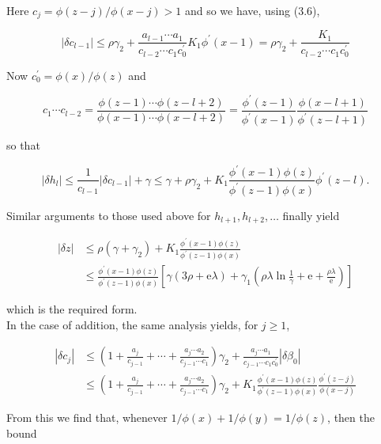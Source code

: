 \documentclass[10pt]{article}
\begin{document}
Here $c_{j}=\phi(z-j) / \phi(x-j)>1$ and so we have, using (3.6),

$$
\left|\delta c_{l-1}\right| \leqslant \rho \gamma_{2}+\frac{a_{l-1} \cdots a_{1}}{c_{l-2} \cdots c_{1} c_{0}^{\prime}} K_{1} \phi^{\prime}(x-1)=\rho \gamma_{2}+\frac{K_{1}}{c_{l-2} \cdots c_{1} c_{0}^{\prime}}
$$

Now $c_{0}^{\prime}=\phi(x) / \phi(z)$ and

$$
c_{1} \cdots c_{l-2}=\frac{\phi(z-1) \cdots \phi(z-l+2)}{\phi(x-1) \cdots \phi(x-l+2)}=\frac{\phi^{\prime}(z-1)}{\phi^{\prime}(x-1)} \frac{\phi(x-l+1)}{\phi^{\prime}(z-l+1)}
$$

so that

$$
\left|\delta h_{l}\right| \leqslant \frac{1}{c_{l-1}}\left|\delta c_{l-1}\right|+\gamma \leqslant \gamma+\rho \gamma_{2}+K_{1} \frac{\phi^{\prime}(x-1) \phi(z)}{\phi^{\prime}(z-1) \phi(x)} \phi^{\prime}(z-l) .
$$

Similar arguments to those used above for $h_{l+1}, h_{l+2}, \ldots$ finally yield


\begin{align*}
|\delta z| & \leqslant \rho\left(\gamma+\gamma_{2}\right)+K_{1} \frac{\phi^{\prime}(x-1) \phi(z)}{\phi^{\prime}(z-1) \phi(x)} \\
& \leqslant \frac{\phi^{\prime}(x-1) \phi(z)}{\phi^{\prime}(z-1) \phi(x)}\left[\gamma(3 \rho+\mathrm{e} \lambda)+\gamma_{1}\left(\rho \lambda \ln \frac{1}{\gamma}+\mathrm{e}+\frac{\rho \lambda}{\mathrm{e}}\right)\right] \tag{3.8}
\end{align*}


which is the required form.\\
In the case of addition, the same analysis yields, for $j \geqslant 1$,

$$
\begin{aligned}
\left|\delta c_{j}\right| & \leqslant\left(1+\frac{a_{j}}{c_{j-1}}+\cdots+\frac{a_{j} \cdots a_{2}}{c_{j-1} \cdots c_{1}}\right) \gamma_{2}+\frac{a_{j} \cdots a_{1}}{c_{j-1} \cdots c_{1} c_{0}^{\prime}}\left|\delta \beta_{0}\right| \\
& \leqslant\left(1+\frac{a_{j}}{c_{j-1}}+\cdots+\frac{a_{j} \cdots a_{2}}{c_{j-1} \cdots c_{1}}\right) \gamma_{2}+K_{1} \frac{\phi^{\prime}(x-1) \phi(z)}{\phi^{\prime}(z-1) \phi(x)} \frac{\phi^{\prime}(z-j)}{\phi(x-j)}
\end{aligned}
$$

From this we find that, whenever $1 / \phi(x)+1 / \phi(y)=1 / \phi(z)$, then the bound
\end{document}
